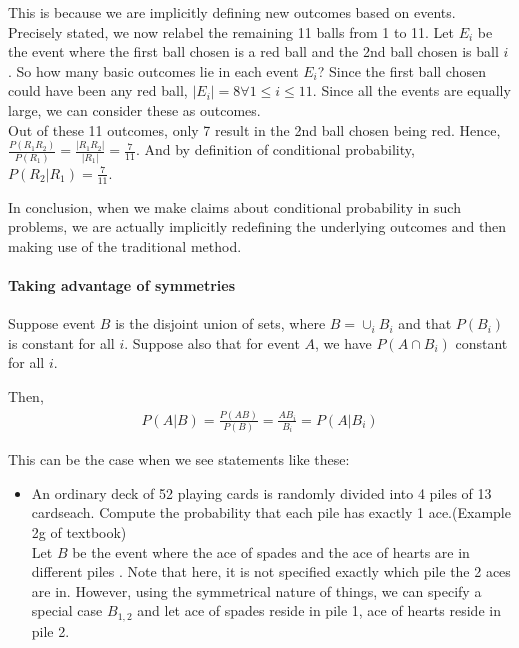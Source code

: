 \documentclass{article}
\begin{document}
This is because we are implicitly defining new outcomes based on events. Precisely stated, we now relabel the remaining 11 balls from 1 to 11. Let $E_i$ be the event where the first ball chosen is a red ball and the 2nd ball chosen is ball $i$. So how many basic outcomes lie in each event $E_i$? Since the first ball chosen could have been any red ball, $|E_i|=8 \forall 1\leq i\leq 11$. Since all the events are equally large, we can consider these as outcomes.\\
Out of these 11 outcomes, only 7 result in the 2nd ball chosen being red. Hence, $\frac{P(R_1R_2)}{P(R_1)}=\frac{|R_1R_2|}{|R_1|}=\frac{7}{11}$. And by definition of conditional probability, $P(R_2|R_1)=\frac{7}{11}$.

In conclusion, when we make claims about conditional probability in such problems, we are actually implicitly redefining the underlying outcomes and then making use of the traditional method.


\paragraph{Taking advantage of symmetries}
Suppose event $B$ is the disjoint union of sets, where $B=\cup_i B_i$ and that $P(B_i)$ is constant for all $i$. Suppose also that for event $A$, we have $P(A\cap B_i)$ constant for all $i$.

Then, \begin{align*}
	P(A|B)=\frac{P(AB)}{P(B)}=\frac{AB_i}{B_i}=P(A|B_i)
\end{align*}

This can be the case when we see statements like these:
\begin{itemize}
	\item An ordinary deck of 52 playing cards is randomly divided into 4 piles of 13 cardseach. Compute the probability that each pile has exactly 1 ace.(Example 2g of textbook)\\
Let $B$ be the event where the ace of spades and the ace of hearts are in different piles . Note that here, it is not specified exactly which pile the 2 aces are in. However, using the symmetrical nature of things, we can specify a special case $B_{1,2}$ and let ace of spades reside in pile 1, ace of hearts reside in pile 2.
\end{itemize}
\end{document}
